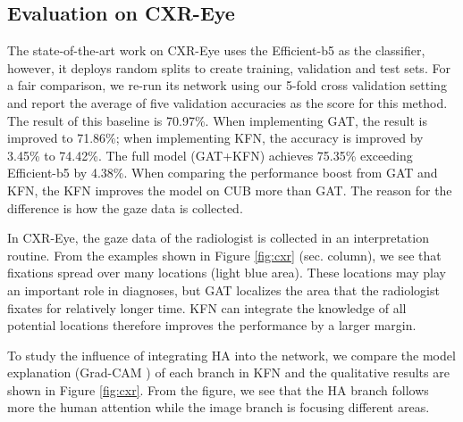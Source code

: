 \documentclass{bmvc2k}
\begin{document}
\subsection{Evaluation on CXR-Eye}
The state-of-the-art work on CXR-Eye \cite{karargyris2021creation} uses the Efficient-b5 \cite{tan2019efficientnet} as the classifier, however, it deploys random splits to create training, validation and test sets. For a fair comparison, we re-run its network using our 5-fold cross validation setting and report the average of five validation accuracies as the score for this method. The result of this baseline is 70.97\%. When implementing GAT, the result is improved to 71.86\%; when implementing KFN, the accuracy is improved by 3.45\% to 74.42\%. The full model (GAT+KFN) achieves 75.35\% exceeding Efficient-b5 \cite{karargyris2021creation} by 4.38\%. When comparing the performance boost from GAT and KFN, the KFN improves the model on CUB more than GAT. The reason for the difference is how the gaze data is collected. 

In CXR-Eye, the gaze data of the radiologist is collected in an interpretation routine. From the examples shown in Figure \ref{fig:cxr} (sec. column), we see that fixations spread over many locations (light blue area). These locations may play an important role in diagnoses, but GAT localizes the area that the radiologist fixates for relatively longer time. KFN can integrate the knowledge of all potential locations therefore improves the performance by a larger margin.




To study the influence of integrating HA into the network, we compare the model explanation (Grad-CAM \cite{20_grad_cam}) of each branch in KFN and the qualitative results are shown in Figure \ref{fig:cxr}. From the figure, we see that the HA branch follows more the human attention while the image branch is focusing different areas. 
\end{document}

